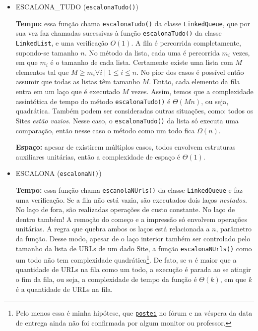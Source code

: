 \documentclass{article}
\def\code#1{\texttt{#1}}
\begin{document}
\begin{itemize}
    \item ESCALONA\_TUDO (\code{escalonaTudo()})

        \textbf{Tempo:} essa função chama \code{escalonaTudo()} da classe \code{LinkedQueue}, que por sua vez faz chamadas sucessivas à função \code{escalonaTudo()} da classe \code{LinkedList}, e uma verificação \( O(1) \). A fila é percorrida completamente, supondo-se tamanho \( n \). No método da lista, cada uma é percorrida \( m_i \) vezes, em que \( m_i \) é o tamanho de cada lista. Certamente existe uma lista com \( M \) elementos tal que \( M \geq m_i \forall i \mid 1 \leq i \leq n \). No pior dos casos é possível então assumir que todas as listas têm tamanho \( M \). Então, cada elemento da fila entra em um laço que é executado \( M \) vezes. Assim, temos que a complexidade assintótica de tempo do método \code{escalonaTudo()} é \( \Theta(Mn) \), ou seja, quadrática. Também podem ser consideradas outras situações, como: todos os Sites \textit{estão vazios.} Nesse caso, o \code{escalonaTudo()} da lista só executa uma comparação, então nesse caso o método como um todo fica \( \Omega(n) \).

        \textbf{Espaço:} apesar de existirem múltiplos casos, todos envolvem estruturas auxiliares unitárias, então a complexidade de espaço é \( \Theta(1) \).

    \item ESCALONA (\code{escalonaN()})

        \textbf{Tempo:} essa função chama \code{escanolaNUrls()} da classe \code{LinkedQueue} e faz uma verificação. Se a fila não está vazia, são executados dois laços \textit{nestados}. No laço de fora, são realizadas operações de custo constante. No laço de dentro também! A remoção do começo e a impressão só envolvem operações unitárias. A regra que quebra ambos os laços está relacionada a \( n \), parâmetro da função. Desse modo, apesar de o laço interior também ser controlado pelo tamanho da lista de URLs de um dado Site, a função \code{escalonaNUrls()} como um todo não tem complexidade quadrática\footnote{Pelo menos essa é minha hipótese, que \href{https://virtual.ufmg.br/20212/mod/forum/discuss.php?d=32885}{\nolinkurl{postei}} no fórum e na véspera da data de entrega ainda não foi confirmada por algum monitor ou professor.}. De fato, se \( n \) é maior que a quantidade de URLs na fila como um todo, a execução é parada ao se atingir o fim da fila, ou seja, a complexidade de tempo da função é \( \Theta(k) \), em que \( k \) é a quantidade de URLs na fila.


\end{itemize}
\end{document}
